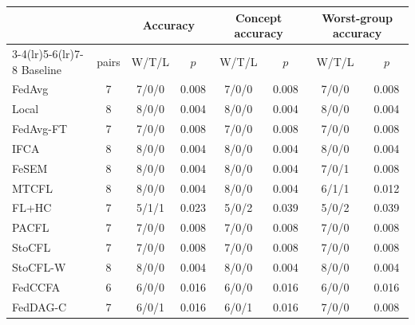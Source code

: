 \small
\begin{tabular}{lccccccc}
\toprule
& & \multicolumn{2}{c}{Accuracy} & \multicolumn{2}{c}{Concept accuracy} & \multicolumn{2}{c}{Worst-group accuracy} \\
\cmidrule(lr){3-4}\cmidrule(lr){5-6}\cmidrule(lr){7-8}
Baseline & pairs & W/T/L & $p$ & W/T/L & $p$ & W/T/L & $p$ \\
\midrule
FedAvg & 7 & 7/0/0 & 0.008 & 7/0/0 & 0.008 & 7/0/0 & 0.008 \\
Local & 8 & 8/0/0 & 0.004 & 8/0/0 & 0.004 & 8/0/0 & 0.004 \\
FedAvg-FT & 7 & 7/0/0 & 0.008 & 7/0/0 & 0.008 & 7/0/0 & 0.008 \\
IFCA & 8 & 8/0/0 & 0.004 & 8/0/0 & 0.004 & 8/0/0 & 0.004 \\
FeSEM & 8 & 8/0/0 & 0.004 & 8/0/0 & 0.004 & 7/0/1 & 0.008 \\
MTCFL & 8 & 8/0/0 & 0.004 & 8/0/0 & 0.004 & 6/1/1 & 0.012 \\
FL+HC & 7 & 5/1/1 & 0.023 & 5/0/2 & 0.039 & 5/0/2 & 0.039 \\
PACFL & 7 & 7/0/0 & 0.008 & 7/0/0 & 0.008 & 7/0/0 & 0.008 \\
StoCFL & 7 & 7/0/0 & 0.008 & 7/0/0 & 0.008 & 7/0/0 & 0.008 \\
StoCFL-W & 8 & 8/0/0 & 0.004 & 8/0/0 & 0.004 & 8/0/0 & 0.004 \\
FedCCFA & 6 & 6/0/0 & 0.016 & 6/0/0 & 0.016 & 6/0/0 & 0.016 \\
FedDAG-C & 7 & 6/0/1 & 0.016 & 6/0/1 & 0.016 & 7/0/0 & 0.008 \\
\bottomrule
\end{tabular}
